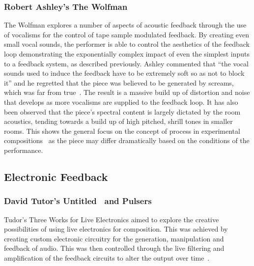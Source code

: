 \documentclass[titlepage]{scrartcl}
\begin{document}
    \subsubsection{Robert Ashley's The Wolfman~\citeyearpar{ashley2003w}}\label{wolfman} 
    
    The Wolfman explores a number of aspects of acoustic feedback through the
    use of vocalisms for the control of tape sample modulated feedback. By
    creating even small vocal sounds, the performer is able to control the
    aesthetics of the feedback loop demonstrating the exponentially complex
    impact of even the simplest inputs to a feedback system, as described
    previously. Ashley commented that ``the vocal sounds used to induce the
    feedback have to be extremely soft so as not to block it'' and he regretted
    that the piece was believed to be generated by screams, which was far from
    true~\parencite[p.37]{gann2012ra}. The result is a massive build up of
    distortion and noise that develops as more vocalisms are supplied to the
    feedback loop. It has also been observed that the piece's spectral content
    is largely dictated by the room acoustics, tending towards a build up of
    high pitched, shrill tones in smaller rooms. This shows the general focus
    on the concept of process in experimental
    compositions~\parencite[p.18]{cage2011silence} as the piece may differ
    dramatically based on the conditions of the performance.

    \subsection{Electronic Feedback}\label{ElecFeed}
    \subsubsection{David Tutor's Untitled~\citeyearpar{tudor1996twfle} and Pulsers~\citeyearpar{tudor1996twfle}}\label{tudor}
    Tudor's Three Works for Live Electronics aimed to explore the creative
    possibilities of using live electronics for composition. This was achieved
    by creating custom electronic circuitry for the generation, manipulation
    and feedback of audio. This was then controlled through the live filtering
    and amplification of the feedback circuits to alter the output over
    time~\parencite[p.187]{holmes2012eaem}.
    
\end{document}
